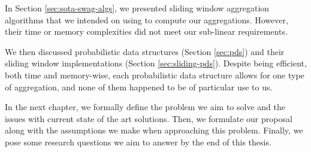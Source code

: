 In Section \ref{sec:sota-swag-algs}, we presented sliding window aggregation algorithms that we intended on using to compute our aggregations. However, their time or memory complexities did not meet our sub-linear requirements.

We then discussed probabilistic data structures (Section \ref{sec:pds}) and their sliding window implementations (Section \ref{sec:sliding-pds}). Despite being efficient, both time and memory-wise, each probabilistic data structure allows for one type of aggregation, and none of them happened to be of particular use to us.

In the next chapter, we formally define the problem we aim to solve and the issues with current state of the art solutions. Then, we formulate our proposal along with the assumptions we make when approaching this problem. Finally, we pose some research questions we aim to answer by the end of this thesis.
